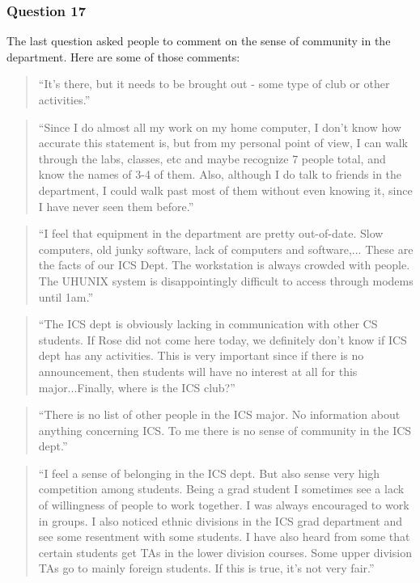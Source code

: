 \subsubsection{Question 17}

The last question asked people to comment on the sense of community in the
department.  Here are some of those comments:

\begin{quote}
  ``It's there, but it needs to be brought out - some type of club or other
  activities.''
\end{quote}

\begin{quote}
  ``Since I do almost all my work on my home computer, I don't know how accurate
  this statement is, but from my personal point of view, I can walk through the
  labs, classes, etc and maybe recognize 7 people total, and know the names of
  3-4 of them.  Also, although I do talk to friends in the department, I could
  walk past most of them without even knowing it, since I have never seen them
  before.''
\end{quote}

\begin{quote}
  ``I feel that equipment in the department are pretty out-of-date.  Slow
  computers, old junky software, lack of computers and software,...  These are
  the facts of our ICS Dept.  The workstation is always crowded with people.  The
  UHUNIX system is disappointingly difficult to access through modems until
  1am.''
\end{quote}

\begin{quote}
``The ICS dept is obviously lacking in communication with other CS students.
If Rose did not come here today, we definitely don't know if ICS dept has any
activities.  This is very important since if there is no announcement, then
students will have no interest at all for this major...Finally, where is the ICS
club?''
\end{quote}

\begin{quote}
  ``There is no list of other people in the ICS major.  No information about
  anything concerning ICS.  To me there is no sense of community in the ICS
  dept.''
\end{quote}

\begin{quote}
  ``I feel a sense of belonging in the ICS dept.  But also sense very high
  competition among students.  Being a grad student I sometimes see a lack of
  willingness of people to work together.  I was always encouraged to work in
  groups.  I also noticed ethnic divisions in the ICS grad department and see
  some resentment with some students.  I have also heard from some that certain
  students get TAs in the lower division courses.  Some upper division TAs go to
  mainly foreign students.  If this is true, it's not very fair.''
\end{quote}

